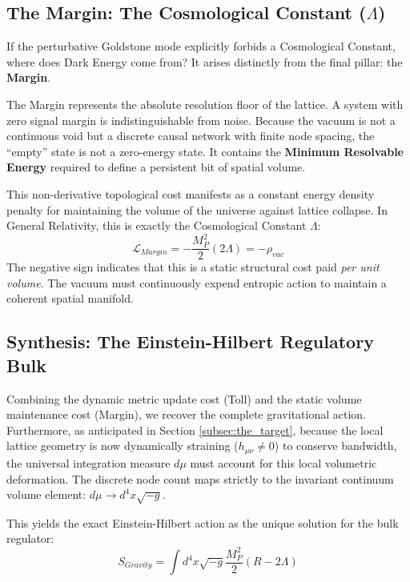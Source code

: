 \subsection{The Margin: The Cosmological Constant (\texorpdfstring{$\Lambda$}{Lambda})}
If the perturbative Goldstone mode explicitly forbids a Cosmological Constant, where does Dark Energy come from? It arises distinctly from the final pillar: the \textbf{Margin}.

The Margin represents the absolute resolution floor of the lattice. A system with zero signal margin is indistinguishable from noise. Because the vacuum is not a continuous void but a discrete causal network with finite node spacing, the ``empty'' state is not a zero-energy state. It contains the \textbf{Minimum Resolvable Energy} required to define a persistent bit of spatial volume.

This non-derivative topological cost manifests as a constant energy density penalty for maintaining the volume of the universe against lattice collapse. In General Relativity, this is exactly the Cosmological Constant $\Lambda$:
\begin{equation}
    \mathcal{L}_{Margin} = - \frac{M_P^2}{2} (2\Lambda) = - \rho_{vac}
\end{equation}
The negative sign indicates that this is a static structural cost paid \textit{per unit volume}. The vacuum must continuously expend entropic action to maintain a coherent spatial manifold.

\subsection{Synthesis: The Einstein-Hilbert Regulatory Bulk}
Combining the dynamic metric update cost (Toll) and the static volume maintenance cost (Margin), we recover the complete gravitational action. Furthermore, as anticipated in Section \ref{subsec:the_target}, because the local lattice geometry is now dynamically straining ($h_{\mu\nu} \neq 0$) to conserve bandwidth, the universal integration measure $d\mu$ must account for this local volumetric deformation. The discrete node count maps strictly to the invariant continuum volume element: $d\mu \to d^4x \sqrt{-g}$.

This yields the exact Einstein-Hilbert action as the unique solution for the bulk regulator:
\begin{equation}
    S_{Gravity} = \int d^4x \sqrt{-g} \frac{M_P^2}{2} (R - 2\Lambda)
\end{equation}

